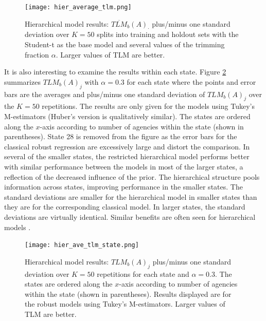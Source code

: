 \documentclass[ba]{imsart}
\begin{document}
\begin{figure}[t]
\centering
\texttt{[image: hier\_average\_tlm.png]}
\caption{Hierarchical model results: $\overline{TLM}_b(A)_{\cdot}$  plus/minus one standard deviation over $K = 50$ splits into training and holdout sets with the Student-t as the base model and several values of the trimming fraction $\alpha$. Larger values of TLM are better.}
\label{fig:hierTLM}
\end{figure}


It is also interesting to examine the results within each state. Figure \ref{fig:hierTLMstate} summarizes ${TLM}_b(A)_{j}$ with $\alpha = 0.3$ for each state where the points and error bars are the averages and plus/minus one standard deviation of ${TLM}_b(A)_{j}$ over the $K = 50$ repetitions. The results are only given for the models using Tukey's M-estimators (Huber's version is qualitatively similar). The states are ordered along the $x$-axis according to number of agencies within the state (shown in parentheses). State 28 is removed from the figure as the error bars for the classical robust regression are excessively large and distort the comparison.  In several of the smaller states, the restricted hierarchical model performs better with similar performance between the models in most of the larger states, a reflection of the decreased influence of the prior.  The hierarchical structure pools information across states, improving performance in the smaller states. The standard deviations are smaller for the hierarchical model in smaller states than they are for the corresponding classical model.  In larger states, the standard deviations are virtually identical. Similar benefits are often seen for hierarchical models \citep[e.g.,][]{gelman2006}. 

 
\begin{figure}[t]
\centering
\texttt{[image: hier\_ave\_tlm\_state.png]}
\caption{Hierarchical model results: ${TLM}_b(A)_{j}$  plus/minus one standard deviation over $K = 50$ repetitions for each state and $\alpha = 0.3$. The states are ordered along the $x$-axis according to number of agencies within the state (shown in parentheses). Results displayed are for the robust models using Tukey's M-estimators. Larger values of TLM are better.}
\label{fig:hierTLMstate}
\end{figure}
\end{document}
